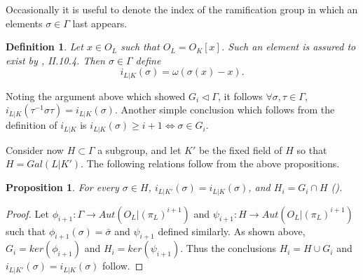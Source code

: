 \documentclass[paper=a4, fontsize=11pt]{scrartcl} %
\numberwithin{equation}{section} %
\numberwithin{figure}{section} %
\numberwithin{table}{section} %
\theoremstyle{break}
\newtheorem{defn}{Definition}
\newtheorem{prop}{Proposition}
\begin{document}
Occasionally it is useful to denote the index of the ramification group in which an elements $\sigma\in\Gamma$ last appears. 
\begin{defn}
Let $x\in O_L$ such that $O_L=O_K[x]$. Such an element is assured to exist by \cite{Neukirch}, II.10.4. Then $\sigma\in\Gamma$ define
$$
i_{L|K}(\sigma) = \omega(\sigma(x)-x).
$$
\end{defn}
Noting the argument above which showed $G_i \triangleleft \Gamma$, it follows $\forall \sigma,\tau \in \Gamma$, $i_{L|K}(\tau^{-1}\sigma \tau) = i_{L|K}(\sigma)$. Another simple conclusion which follows from the definition of $i_{L|K}$ is $i_{L|K}(\sigma)\geq i+1 \iff \sigma\in G_i$.

Consider now $H\subset\Gamma$ a subgroup, and let $K'$ be the fixed field of $H$ so that $H=Gal(L|K')$. The following relations follow from the above propositions.
\begin{prop}
For every $\sigma\in H$, $i_{L|K'}(\sigma)=i_{L|K}(\sigma)$, and $H_i=G_i \cap H$ (\cite{Serre}).
\end{prop}
\begin{proof}
Let $\phi_{i+1}:\Gamma \to Aut(O_L|(\pi_L)^{i+1})$ and $\psi_{i+1}:H \to Aut(O_L|(\pi_L)^{i+1})$ such that $\phi_{i+1}(\sigma)=\bar{\sigma}$ and $\psi_{i+1}$ defined similarly. As shown above, $G_i = ker(\phi_{i+1})$ and $H_i = ker(\psi_{i+1})$. Thus the conclusions $H_i = H\cup G_i$ and $i_{L|K'}(\sigma)=i_{L|K}(\sigma)$ follow.
\end{proof}
\end{document}
